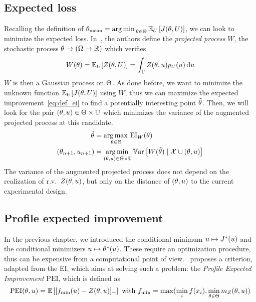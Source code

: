 \documentclass[../../Main_ManuscritThese.tex]{subfiles}
\begin{document}
\subsection{Expected loss}
\label{ssec:expected_loss_GP_projection}
Recalling the definition of ${\theta}_{\mathrm{mean}} = \operatorname*{arg\,min \,}_{\theta \in \Theta} \mathbb{E}_{U}\left[J(\theta, U)\right]$, we can look to minimize the expected loss. 
In~\cite{janusevskis_simultaneous_2010}, the authors define the \emph{projected process} $W$, the stochastic process $\theta \rightarrow \left(\Omega \rightarrow \mathbb{R}\right)$ which verifies
\begin{equation}
  W(\theta) = \mathbb{E}_U[Z(\theta, U)] = \int_{\mathbb{U}} Z(\theta, u) p_{U}(u)\,\mathrm{d}u
\end{equation}
$W$ is then a Gaussian process on $\Theta$. As done before, we want to minimize the unknown function $\mathbb{E}_U[J(\theta, U)]$ using $W$, thus we can maximize the expected improvement~\cref{eq:def_ei} to find a potentially interesting point $\tilde{\theta}$.
Then, we will look for the pair $(\theta, u) \in \Theta\times \mathbb{U}$ which minimizes the variance of the augmented projected process at this candidate.
\begin{align}
  \tilde{\theta} &= \operatorname*{arg\,max \,}_{\theta \in \Theta} \mathrm{EI}_W(\theta) \\
  (\theta_{n+1}, u_{n+1}) &= \operatorname*{arg\,min \,}_{(\theta, u)\in\Theta\times \mathbb{U}} \mathbb{V}\mathrm{ar}\left[W(\tilde{\theta}) \mid \mathcal{X} \cup (\theta,u) \right]
\end{align}
The variance of the augmented projected process does not depend on the realization of r.v.\ $Z(\theta, u)$, but only on the distance of $(\theta, u)$ to the current experimental design.

\subsection{Profile expected improvement}
In the previous chapter, we introduced the conditional minimum $u\mapsto J^*(u)$ and the conditional minimizers $u \mapsto \theta^*(u)$. These require an optimization procedure, thus can be expensive from a computational point of view.~\cite{ginsbourger_bayesian_2014} proposes a criterion, adapted from the EI, which aims at solving such a problem: the \emph{Profile Expected Improvement} $\mathrm{PEI}$, which is defined as
\begin{equation}
  \label{eq:def_PEI}
  \mathrm{PEI}(\theta, u)= \mathbb{E}\left[[f_{\min}(u) - Z(\theta, u)]_+\right] \text{ with } f_{\min} = \max(\min_i f(x_i), \min_{\theta \in \Theta} m_Z(\theta, u))
\end{equation}
\end{document}
